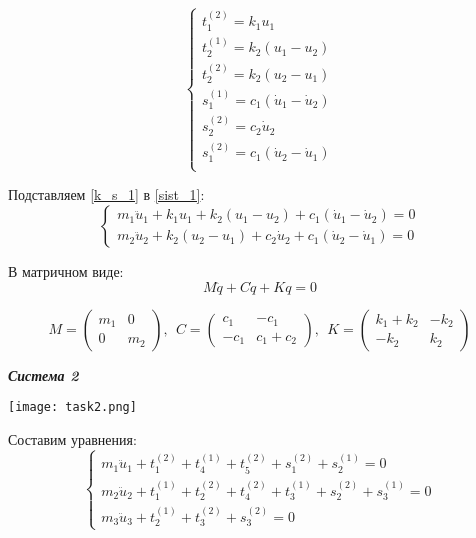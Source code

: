 \documentclass[a4paper, 12pt]{article}
\begin{document}
\begin{equation} \label{k_s_1} 
\begin{cases}
t_1^{(2)} = k_1 u_1\\
t_2^{(1)} = k_2 (u_1 - u_2)\\
t_2^{(2)} = k_2 (u_2 - u_1)\\
s_1^{(1)} = c_1 (\dot u_1 - \dot u_2)\\
s_2^{(2)} = c_2 \dot u_2\\
s_1^{(2)} = c_1 (\dot u_2 - \dot u_1)\\
\end{cases}
\end{equation}

Подставляем \eqref{k_s_1} в \eqref{sist_1}:
\[
\begin{cases}
m_1\ddot u_1 + k_1 u_1 + k_2 (u_1 - u_2) + c_1 (\dot u_1 - \dot u_2) = 0 \\
m_2\ddot u_2 + k_2 (u_2 - u_1) + c_2 \dot u_2 + c_1 (\dot u_2 - \dot u_1) = 0
\end{cases}
\]

В матричном виде:
\[
M \ddot q + C \dot q + K q = 0
\]

\[
M = \begin{pmatrix}
m_1 & 0 \\
0 & m_2
\end{pmatrix},\ \ 
C = \begin{pmatrix}
c_1 & -c_1 \\
-c_1 & c_1 + c_2
\end{pmatrix},\ \ 
K = \begin{pmatrix}
k_1 + k_2 & -k_2 \\
-k_2 & k_2
\end{pmatrix}
\]

\newpage
\begin{center}
\textbf{\textit{Система 2}}
\end{center}

\texttt{[image: task2.png]}

Составим уравнения:
\begin{equation} \label{sist_2} 
\begin{cases}
m_1\ddot u_1 + t_1^{(2)} + t_4^{(1)} + t_5^{(2)} + s_1^{(2)} + s_2^{(1)} = 0\\
m_2\ddot u_2 + t_1^{(1)} + t_2^{(2)}+ t_4^{(2)} + t_3^{(1)}  + s_2^{(2)} + s_3^{(1)} = 0\\
m_3\ddot u_3 + t_2^{(1)} + t_3^{(2)} + s_3^{(2)} = 0 
\end{cases}
\end{equation}
\end{document}
